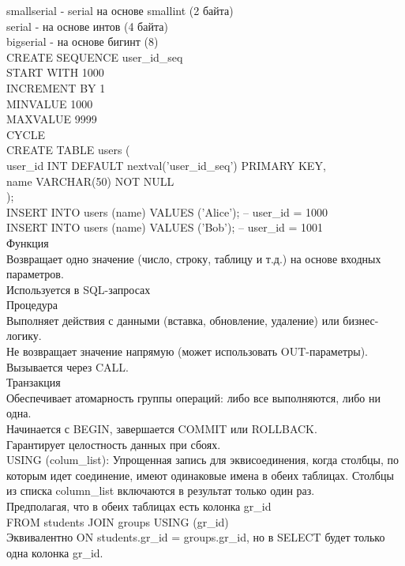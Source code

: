 \noindent smallserial - serial на основе smallint (2 байта)\\
serial - на основе интов (4 байта)\\
bigserial - на основе бигинт (8) \\

\noindent CREATE SEQUENCE user\_id\_seq \\
    START WITH 1000 \\
    INCREMENT BY 1  \\
    MINVALUE 1000   \\
    MAXVALUE 9999  \\
    CYCLE \\
CREATE TABLE users ( \\
    user\_id INT DEFAULT nextval('user\_id\_seq') PRIMARY KEY, \\
    name VARCHAR(50) NOT NULL \\
); \\

\noindent INSERT INTO users (name) VALUES  ('Alice'); -- user\_id = 1000 \\
INSERT INTO users (name) VALUES ('Bob');   -- user\_id = 1001   \\ 

\noindent Функция \\
Возвращает одно значение (число, строку, таблицу и т.д.) на основе входных параметров. \\
Используется в SQL-запросах \\
Процедура \\
Выполняет действия с данными (вставка, обновление, удаление) или бизнес-логику. \\
Не возвращает значение напрямую (может использовать OUT-параметры). Вызывается через CALL. \\
Транзакция \\
Обеспечивает атомарность группы операций: либо все выполняются, либо ни одна. \\
Начинается с BEGIN, завершается COMMIT или ROLLBACK. \\
Гарантирует целостность данных при сбоях. \\

\noindent USING (colum\_list): Упрощенная запись для эквисоединения, когда столбцы, по которым идет соединение, имеют одинаковые имена в обеих таблицах. Столбцы из списка column\_list включаются в результат только один раз. \\

\noindent Предполагая, что в обеих таблицах есть колонка gr\_id \\
FROM students JOIN groups USING (gr\_id) \\
Эквивалентно ON students.gr\_id = groups.gr\_id, но в SELECT будет только одна колонка gr\_id. \\

